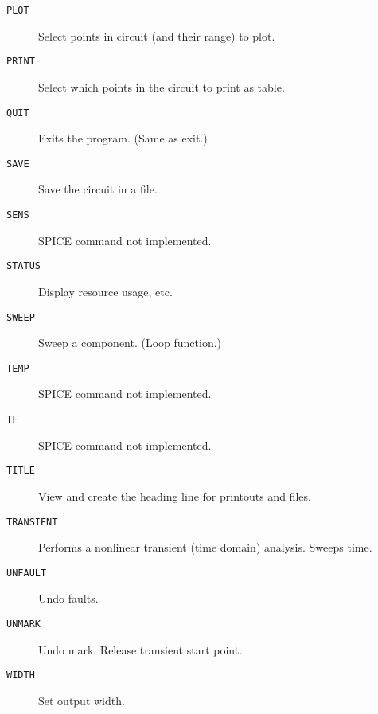\begin{description}
\item[{\tt PLOT}] Select points in circuit (and their range) to plot.

\item[{\tt PRINT}] Select which points in the circuit to print as table.

\item[{\tt QUIT}] Exits the program.  (Same as exit.)

\item[{\tt SAVE}] Save the circuit in a file.

\item[{\tt SENS}] SPICE command not implemented.

\item[{\tt STATUS}] Display resource usage, etc.

\item[{\tt SWEEP}] Sweep a component.  (Loop function.)

\item[{\tt TEMP}] SPICE command not implemented.

\item[{\tt TF}] SPICE command not implemented.

\item[{\tt TITLE}] View and create the heading line for printouts and files.

\item[{\tt TRANSIENT}] Performs a nonlinear transient (time domain)
analysis.  Sweeps time.

\item[{\tt UNFAULT}] Undo faults.

\item[{\tt UNMARK}] Undo mark.  Release transient start point.

\item[{\tt WIDTH}] Set output width.

\end{description}
